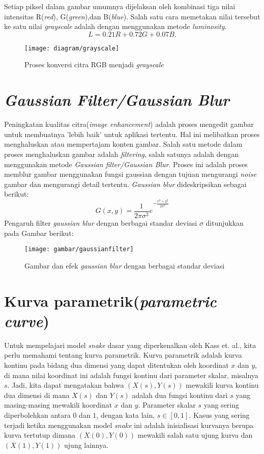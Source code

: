 Setiap piksel dalam gambar umumnya dijelaksan oleh kombinasi tiga nilai intensitas R(\emph{red}), G(\emph{green}),dan B(\emph{blue}). Salah satu cara memetakan nilai tersebut ke satu nilai \emph{grayscale} adalah dengan menggunakan metode \emph{luminosity}\citep{kumar2016gray}.
\begin{equation}
	\label{luminosity}
	L = 0.21 R + 0.72 G + 0.07 B.
\end{equation}

\begin{figure}[H]
	\centering
	\texttt{[image: diagram/grayscale]}
	\caption{Proses konversi citra RGB menjadi \emph{grayscale}}
	\label{Gambar:grayscalediagram}
\end{figure}

\section{\emph{Gaussian Filter/Gaussian Blur}}
Peningkatan kualitas citra(\emph{image enhancement}) adalah proses mengedit gambar untuk membuatnya 'lebih baik' untuk aplikasi tertentu\citep{tyagi2018understanding}. Hal ini melibatkan proses menghaluskan atau mempertajam konten gambar. Salah satu metode dalam proses menghaluskan gambar adalah \emph{filtering}, salah satunya adalah dengan menggunakan metode \emph{Gaussian filter/Gaussian Blur}. Proses ini adalah proses memblur gambar menggunakan fungsi gaussian dengan tujuan mengurangi \emph{noise} gambar dan mengurangi detail tertentu. \emph{Gaussian blur} dideskripsikan sebagai berikut:
\begin{equation}
	\label{gaussblur}
	G(x,y) = {\frac{1}{2 \pi \sigma^2} e}^{-{\frac{x^2+y^2}{2 \sigma^2}}}
\end{equation}
Pengaruh filter \emph{gaussian blur} dengan berbagai standar deviasi $\sigma$ ditunjukkan pada Gambar berikut:
\begin{figure}[H]
	\centering
	\texttt{[image: gambar/gaussianfilter]}
	\caption{Gambar dan efek \emph{gaussian blur} dengan berbagai standar deviasi\citep{tyagi2018understanding}}
	\label{Gambar:gaussianfilter}
\end{figure}

\section{Kurva parametrik(\emph{parametric curve})}
Untuk mempelajari model \emph{snake} dasar yang diperkenalkan oleh Kass et. al., kita perlu memahami tentang kurva parametrik. Kurva parametrik adalah kurva kontinu pada bidang dua dimensi yang dapat ditentukan oleh koordinat $x$ dan $y$, di mana nilai koordinat ini adalah fungsi kontinu dari parameter skalar, misalnya $s$. Jadi, kita dapat mengatakan bahwa $(X(s), Y(s))$ mewakili kurva kontinu dua dimensi di mana $X(s)$ dan $Y(s)$ adalah dua fungsi kontinu dari $s$ yang masing-masing mewakili koordinat $x$ dan $y$. Parameter skalar $s$ yang sering diperbolehkan antara $0$ dan $1$, dengan kata lain, $s \in [0, 1]$. Kasus yang sering terjadi ketika menggunakan model \emph{snake} ini adalah inisialisasi kurvanya berupa kurva tertutup dimana $(X(0), Y(0))$ mewakili salah satu ujung kurva dan $(X(1), Y(1))$ ujung lainnya\citep{acton2007biomedical:19}.


